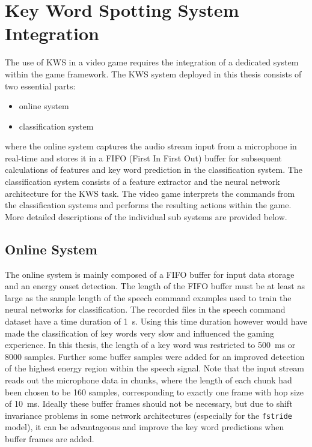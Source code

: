 
\section{Key Word Spotting System Integration}
The use of KWS in a video game requires the integration of a dedicated system within the game framework.
The KWS system deployed in this thesis consists of two essential parts:
\begin{itemize}
	\item online system
	\item classification system
\end{itemize}
where the online system captures the audio stream input from a microphone in real-time and stores it in a FIFO (First In First Out) buffer for subsequent calculations of features and key word prediction in the classification system.
The classification system consists of a feature extractor and the neural network architecture for the KWS task.
The video game interprets the commands from the classification systems and performs the resulting actions within the game.
More detailed descriptions of the individual sub systems are provided below.



\subsection{Online System}
The online system is mainly composed of a FIFO buffer for input data storage and an energy onset detection.
The length of the FIFO buffer must be at least as large as the sample length of the speech command examples used to train the neural networks for classification.
The recorded files in the speech command dataset have a time duration of \SI{1}{\second}. 
Using this time duration however would have made the classification of key words very slow and influenced the gaming experience.
In this thesis, the length of a key word was restricted to \SI{500}{\milli\second} or 8000 samples.
Further some buffer samples were added for an improved detection of the highest energy region within the speech signal.
Note that the input stream reads out the microphone data in chunks, where the length of each chunk had been chosen to be 160 samples, corresponding to exactly one frame with hop size of \SI{10}{\milli\second}.
Ideally these buffer frames should not be necessary, but due to shift invariance problems in some network architectures (especially for the \texttt{fstride} model), it can be advantageous and improve the key word predictions when buffer frames are added.

